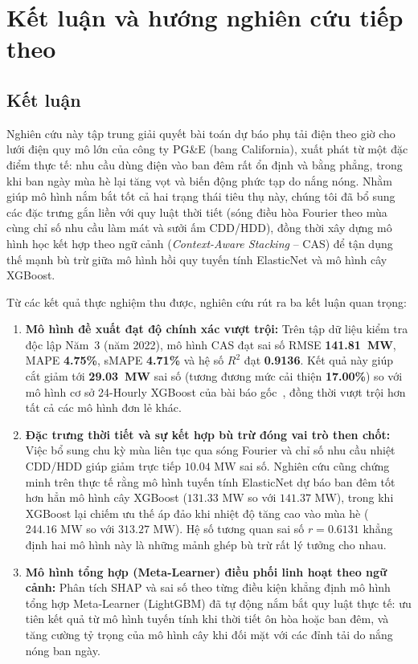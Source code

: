 \section{Kết luận và hướng nghiên cứu tiếp theo}
\label{sec:conclusion_and_future_work}

\subsection{Kết luận}
\label{subsec:conclusion}

Nghiên cứu này tập trung giải quyết bài toán dự báo phụ tải điện theo giờ cho lưới điện quy mô lớn của công ty PG\&E (bang California), xuất phát từ một đặc điểm thực tế: nhu cầu dùng điện vào ban đêm rất ổn định và bằng phẳng, trong khi ban ngày mùa hè lại tăng vọt và biến động phức tạp do nắng nóng. Nhằm giúp mô hình nắm bắt tốt cả hai trạng thái tiêu thụ này, chúng tôi đã bổ sung các đặc trưng gắn liền với quy luật thời tiết (sóng điều hòa Fourier theo mùa cùng chỉ số nhu cầu làm mát và sưởi ấm CDD/HDD), đồng thời xây dựng mô hình học kết hợp theo ngữ cảnh (\textit{Context-Aware Stacking} -- CAS) để tận dụng thế mạnh bù trừ giữa mô hình hồi quy tuyến tính ElasticNet và mô hình cây XGBoost.

Từ các kết quả thực nghiệm thu được, nghiên cứu rút ra ba kết luận quan trọng:
\begin{enumerate}
    \item \textbf{Mô hình đề xuất đạt độ chính xác vượt trội:} Trên tập dữ liệu kiểm tra độc lập Năm~3 (năm 2022), mô hình CAS đạt sai số RMSE \textbf{141.81~MW}, MAPE \textbf{4.75\%}, sMAPE \textbf{4.71\%} và hệ số $R^2$ đạt \textbf{0.9136}. Kết quả này giúp cắt giảm tới \textbf{29.03~MW} sai số (tương đương mức cải thiện \textbf{17.00\%}) so với mô hình cơ sở 24-Hourly XGBoost của bài báo gốc~\cite{roy2025hourly}, đồng thời vượt trội hơn tất cả các mô hình đơn lẻ khác.
    \item \textbf{Đặc trưng thời tiết và sự kết hợp bù trừ đóng vai trò then chốt:} Việc bổ sung chu kỳ mùa liên tục qua sóng Fourier và chỉ số nhu cầu nhiệt CDD/HDD giúp giảm trực tiếp $10.04\text{ MW}$ sai số. Nghiên cứu cũng chứng minh trên thực tế rằng mô hình tuyến tính ElasticNet dự báo ban đêm tốt hơn hẳn mô hình cây XGBoost ($131.33\text{ MW}$ so với $141.37\text{ MW}$), trong khi XGBoost lại chiếm ưu thế áp đảo khi nhiệt độ tăng cao vào mùa hè ($244.16\text{ MW}$ so với $313.27\text{ MW}$). Hệ số tương quan sai số $r = 0.6131$ khẳng định hai mô hình này là những mảnh ghép bù trừ rất lý tưởng cho nhau.
    \item \textbf{Mô hình tổng hợp (Meta-Learner) điều phối linh hoạt theo ngữ cảnh:} Phân tích SHAP và sai số theo từng điều kiện khẳng định mô hình tổng hợp Meta-Learner (LightGBM) đã tự động nắm bắt quy luật thực tế: ưu tiên kết quả từ mô hình tuyến tính khi thời tiết ôn hòa hoặc ban đêm, và tăng cường tỷ trọng của mô hình cây khi đối mặt với các đỉnh tải do nắng nóng ban ngày.
\end{enumerate}

